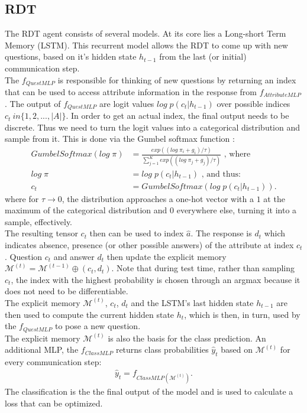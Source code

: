 \documentclass[a4paper,cleardoubleempty,BCOR1cm, 11pt]{report}
\begin{document}
\subsection{RDT}
The RDT agent consists of several models. At its core lies a Long-short Term Memory (LSTM). This recurrent model allows the RDT to come up with new questions, based on it's hidden state $h_{t-1}$ from the last (or initial) communication step.\\
The $f_{QuestMLP}$ is responsible for thinking of new questions by returning an index that can be used to access attribute information in the response from $f_{AttributeMLP}$. The output of $f_{QuestMLP}$ are logit values $log\;p(c_t|h_{t-1})$ over possible indices $c_t \ in \lbrace 1,2,...,|A| \rbrace$. In order to get an actual index, the final output needs to be discrete. Thus we need to turn the logit values into a categorical distribution and sample from it. This is done via the Gumbel softmax function \cite{jang2016categorical}:
\begin{align}
		GumbelSoftmax(log\;\pi) &= \frac{exp((log\;\pi_i + g_i)/\tau)}{\sum_{j=1}^{K}exp((log\;\pi_j + g_j)/\tau)}\text{ , where}\\
			log\;\pi &=log\;p(c_t|h_{t-1})\text{ , and thus:}\\
			c_t &= GumbelSoftmax(log\;p(c_t|h_{t-1})).
\end{align}
where for $\tau \rightarrow 0$, the distribution approaches a one-hot vector with a $1$ at the maximum of the categorical distribution and $0$ everywhere else, turning it into a sample, effectively.\\
The resulting tensor $c_t$ then can be used to index $\hat{a}$. The response is $d_t$ which indicates absence, presence (or other possible answers) of the attribute at index $c_t$. Question $c_t$ and answer $d_t$ then update the explicit memory $\mathcal{M}^{(t)} = \mathcal{M}^{(t-1)} \oplus (c_t, d_t)$. Note that during test time, rather than sampling $c_t$, the index with the highest probability is chosen through an argmax because it does not need to be differentiable.\\
The explicit memory $\mathcal{M}^{(t)}$, $c_t$, $d_t$ and the LSTM's last hidden state $h_{t-1}$ are then used to compute the current hidden state $h_t$, which is then, in turn, used by the $f_{QuestMLP}$ to pose a new question.\\
The explicit memory $\mathcal{M}^{(t)}$ is also the basis for the class prediction. An additional MLP, the $f_{ClassMLP}$ returns class probabilities $\hat{y}_t$ based on  $\mathcal{M}^{(t)}$ for every communication step:
\begin{align}
	\hat{y}_t = f_{ClassMLP( \mathcal{M}^{(t)})}.
\end{align} The classification is the the final output of the model and is used to calculate a loss that can be optimized.
\end{document}
